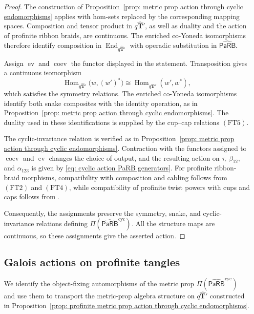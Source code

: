 \documentclass{amsart}
\newcommand{\bT}{\mathbf{T}}
\newcommand{\PaRB}{\mathsf{PaRB}}
\newcommand{\twist}{\tau}
\newcommand{\End}{\operatorname{End}}
\newcommand{\Hom}{\operatorname{Hom}}
\newcommand{\ev}{\operatorname{ev}}
\newcommand{\coev}{\operatorname{coev}}
\theoremstyle{definition}
\numberwithin{equation}{section}
\begin{document}
\begin{proof}
The construction of
Proposition~\ref{prop: metric prop action through cyclic endomorphisms}
applies with hom-sets replaced by the corresponding mapping spaces.
Composition and tensor product in $q\widehat{\bT}'$, as well as
duality and the action of profinite ribbon braids, are continuous.
The enriched co-Yoneda isomorphisms therefore identify composition
in $\End_{q\widehat{\bT}'}$ with operadic substitution in
$\widehat{\PaRB}$.

Assign $\ev$ and $\coev$ the functor displayed in the statement.
Transposition gives a continuous isomorphism
\[
\Hom_{q\widehat{\bT}'}\bigl(w,(w')^*\bigr)
\cong
\Hom_{q\widehat{\bT}'}(w',w^*),
\]
which satisfies the symmetry relations. The enriched co-Yoneda
isomorphisms identify both snake composites with the identity
operation, as in
Proposition~\ref{prop: metric prop action through cyclic endomorphisms}.
The duality used in these identifications is supplied by the
cup--cap relations $\mathrm{(FT5)}$.

The cyclic-invariance relation is verified as in
Proposition~\ref{prop: metric prop action through cyclic endomorphisms}.
Contraction with the functors assigned to $\coev$ and $\ev$
changes the choice of output, and the resulting action on
$\twist$, $\beta_{12}$, and $\alpha_{123}$ is given by
\eqref{eq: cyclic action PaRB generators}. For profinite
ribbon-braid morphisms, compatibility with composition and
cabling follows from $\mathrm{(FT2)}$ and $\mathrm{(FT4)}$,
while compatibility of profinite twist powers with cups and
caps follows from
\cite[Lemma~B.10]{furusho_galois_2017}.

Consequently, the assignments preserve the symmetry, snake, and
cyclic-invariance relations defining
$\Pi(\widehat{\PaRB}^{\mathrm{cyc}})$. All the structure maps are
continuous, so these assignments give the asserted action.
\end{proof}

\subsection{Galois actions on profinite tangles}
\label{subsec:GT_action_profinite_tangles}

We identify the object-fixing automorphisms of the metric
prop $\Pi(\widehat{\PaRB}^{\mathrm{cyc}})$ and use them to
transport the metric-prop algebra structure on
$q\widehat{\bT}'$ constructed in
Proposition~\ref{prop: profinite metric prop action through cyclic endomorphisms}.
\end{document}
